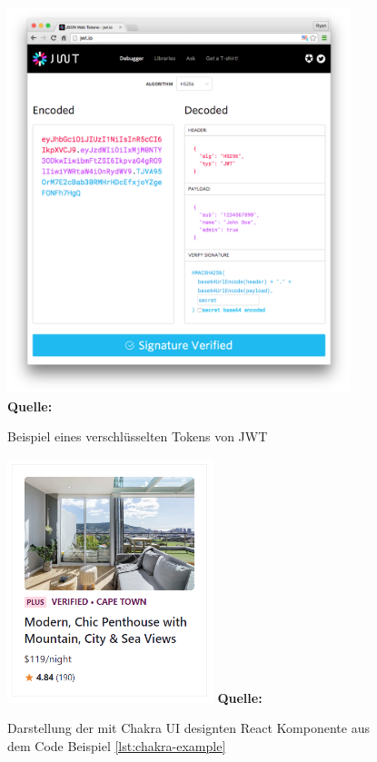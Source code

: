 \documentclass[a4paper,12pt]{report}
\begin{document}
  \begin{figure}[ht]
  \centering
  \includegraphics[width=100mm]{jwt-beispiel.png}
\raggedleft
    \footnotesize\sffamily\textbf{Quelle:} \cite{JWT}
  \caption{Beispiel eines verschlüsselten Tokens von JWT}
  \label{fig:jwt-example}
\end{figure}

  \begin{figure}[ht]
  \centering
  \includegraphics[width=60mm]{Chakra-UI Beispiel.png}
\raggedleft
    \footnotesize\sffamily\textbf{Quelle:} \cite{chakraui}
  \caption{Darstellung der mit Chakra UI designten React Komponente aus dem Code Beispiel \ref{lst:chakra-example}}
  \label{fig:chakra-example}
\end{figure}
  
\end{document}
